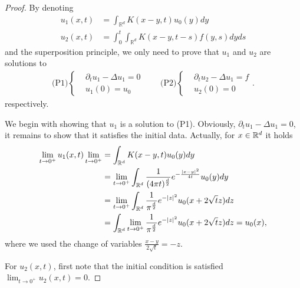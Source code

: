 \begin{proof} By denoting 
	\begin{align*}
	u_{1}(x,t) &=  \int_{\mathbb{R}^{d} } K(x-y,t) u_0(y) dy \\
	u_{2}(x,t)&=  \int_0^{t} \int_{\mathbb{R}^{d} }  K(x-y,t-s)f(y,s)dy ds 
	\end{align*}
	and the superposition principle, we only need to prove that $u_{1}$ and $u_{2}$ are solutions to
	\begin{align*}
	\text{(P1)}\begin{cases}
	&\partial_t u_{1} - \Delta u_{1} = 0 \\
	&u_{1}(0) = u_{0}
	\end{cases}
	\qquad 
	\text{(P2)}\begin{cases}
	&\partial_t u_{2} - \Delta u_{1} = f \\
	&u_{2}(0) = {0}
	\end{cases}
	.\end{align*}
	respectively.
	
  We begin with showing that $u_{1}$ is a solution to (P1). Obviously, $\partial_t u_{1} - \Delta u_{1} = 0$, it remains to show that it satisfies the initial data. Actually, for $x\in \mathbb{R}^d$ it holds
  \begin{align*}
    \lim_{t \to 0^{+}}  u_{1}(x,t) \lim_{t \to 0^{+} }&=\int_{\mathbb{R}^{d} }K(x-y,t)u_0(y) dy \\
    &= \lim_{t \to 0^{+} } \int_{\mathbb{R}^{d} } \frac{1}{(4\pi t)^{\frac{d}{2}}} e^{-\frac{\abs{x-y}^2}{4t}} u_0(y) dy \\ 
                                           &=  \lim_{t \to 0^{+} } \int_{\mathbb{R}^{d} } \frac{1}{\pi^{\frac{d}{2}} } e^{-\abs{z}^2}  u_{0}(x+2 \sqrt{t} z ) dz \\
                                           &= \int_{\mathbb{R}^{d}  } \lim_{t \to 0^{+} } \frac{1}{\pi ^{\frac{d}{2}} } e^{-\abs{z}^2}  u_{0}(x+2 \sqrt{t} z ) dz = u_0(x)  
  ,\end{align*}
  where we used the change of variables $ \frac{x-y}{2 \sqrt{t} }= -z$.
 
  For $u_{2}(x,t)$, first note that  the initial condition is satisfied $ \lim_{t \to 0^{+}}  u_{2}(x,t) = 0$. 
  

\end{proof}
